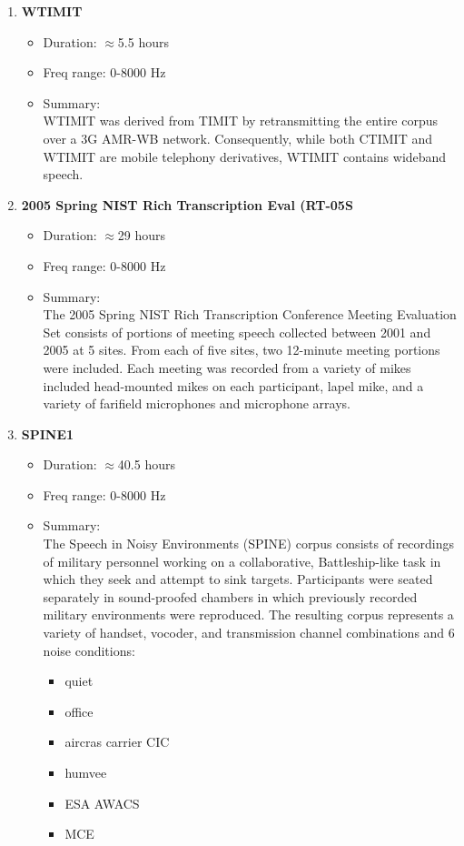 \documentclass[12pt]{article}
\begin{document}
\begin{enumerate}
  \item {\bf WTIMIT} \\
    \begin{itemize}
        \item Duration: $\approx$5.5 hours
        \item Freq range: 0-8000 Hz
        \item Summary:\\
          WTIMIT was derived from TIMIT by retransmitting the entire corpus over a 3G AMR-WB network. Consequently, while both CTIMIT and WTIMIT are mobile telephony derivatives, WTIMIT contains wideband speech.
    \end{itemize}

  \item {\bf 2005 Spring NIST Rich Transcription Eval (RT-05S} \\
    \begin{itemize}
        \item Duration: $\approx$29 hours
        \item Freq range: 0-8000 Hz
        \item Summary: \\
          The 2005 Spring NIST Rich Transcription Conference Meeting Evaluation Set consists of portions of meeting speech collected between 2001 and 2005 at 5 sites. From each of five sites, two 12-minute meeting portions were included. Each meeting was recorded from a variety of mikes included head-mounted mikes on each participant, lapel mike, and a variety of farifield microphones and microphone arrays.
    \end{itemize}

  \item {\bf SPINE1} \\
    \begin{itemize}
        \item Duration: $\approx$40.5 hours
        \item Freq range: 0-8000 Hz
        \item Summary: \\
          The Speech in Noisy Environments (SPINE) corpus consists of recordings of military personnel working on a collaborative, Battleship-like task in which they seek and attempt to sink targets. Participants were seated separately in sound-proofed chambers in which previously recorded military environments were reproduced. The resulting corpus represents a variety of handset, vocoder, and transmission channel combinations and 6 noise conditions:
          \begin{itemize}
            \item quiet
            \item office
            \item aircras carrier CIC
            \item humvee
            \item ESA AWACS
            \item MCE
          \end{itemize}
    \end{itemize}


\end{enumerate}
\end{document}
